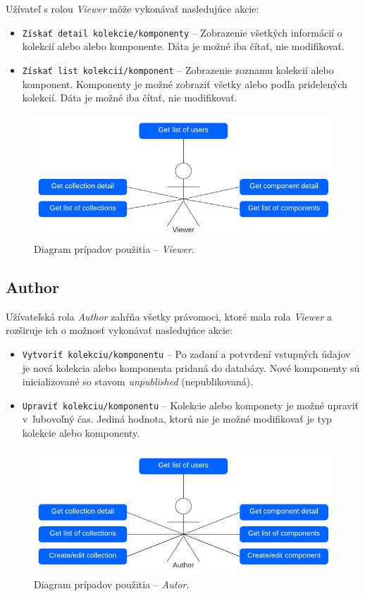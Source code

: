 \noindent Užívateľ s rolou \emph{Viewer} môže vykonávať nasledujúce akcie:

\begin{itemize}
	\item \texttt{Získať detail kolekcie/komponenty} -- Zobrazenie všetkých informácií o kolekcií alebo alebo komponente. Dáta je možné iba čítať, nie modifikovať.
	\item \texttt{Získať list kolekcií/komponent} -- Zobrazenie zoznamu kolekcií alebo komponent. Komponenty je možné zobraziť všetky alebo podľa pridelených kolekcií. Dáta je možné iba čítať, nie modifikovať.
\end{itemize}

\begin{figure}[h]
	\centering
	\includegraphics[scale=0.9]{obrazky-figures/viewer_use_case}
	\caption{Diagram prípadov použitia -- \emph{Viewer}.}
\end{figure}

\subsection{Author}
Užívateľská rola \emph{Author} zahŕňa všetky právomoci, ktoré mala rola \emph{Viewer} a rozširuje ich o možnosť vykonávať nasledujúce akcie:

\begin{itemize}
	\item \texttt{Vytvoriť kolekciu/komponentu} -- Po zadaní a potvrdení vstupných údajov je nová kolekcia alebo komponenta pridaná do databázy. Nové komponenty sú inicializované so stavom \emph{unpublished} (nepublikovaná).
	\item \texttt{Upraviť kolekciu/komponentu} -- Kolekcie alebo komponety je možné upraviť v~ľubovoľný čas. Jediná hodnota, ktorú nie je možné modifikovať je typ kolekcie alebo komponenty.
\end{itemize}

\begin{figure}[h]
	\centering
	\includegraphics[scale=0.9]{obrazky-figures/author_use_case}
	\caption{Diagram prípadov použitia -- \emph{Autor}.}
\end{figure}

